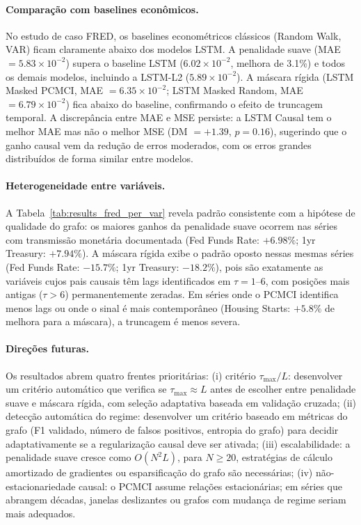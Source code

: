 \documentclass[12pt, a4paper]{article}
\begin{document}
\paragraph{Comparação com baselines econômicos.}
No estudo de caso FRED, os baselines econométricos clássicos (Random Walk, VAR) ficam claramente abaixo dos modelos LSTM. A penalidade suave (MAE $= 5.83 \times 10^{-2}$) supera o baseline LSTM ($6.02 \times 10^{-2}$, melhora de 3.1\%) e todos os demais modelos, incluindo a LSTM-L2 ($5.89 \times 10^{-2}$). A máscara rígida (LSTM Masked PCMCI, MAE $= 6.35 \times 10^{-2}$; LSTM Masked Random, MAE $= 6.79 \times 10^{-2}$) fica abaixo do baseline, confirmando o efeito de truncagem temporal. A discrepância entre MAE e MSE persiste: a LSTM Causal tem o melhor MAE mas não o melhor MSE (DM $= +1.39$, $p = 0.16$), sugerindo que o ganho causal vem da redução de erros moderados, com os erros grandes distribuídos de forma similar entre modelos.

\paragraph{Heterogeneidade entre variáveis.}
A Tabela~\ref{tab:results_fred_per_var} revela padrão consistente com a hipótese de qualidade do grafo: os maiores ganhos da penalidade suave ocorrem nas séries com transmissão monetária documentada (Fed Funds Rate: $+6.98\%$; 1yr Treasury: $+7.94\%$). A máscara rígida exibe o padrão oposto nessas mesmas séries (Fed Funds Rate: $-15.7\%$; 1yr Treasury: $-18.2\%$), pois são exatamente as variáveis cujos pais causais têm lags identificados em $\tau = 1$--$6$, com posições mais antigas ($\tau > 6$) permanentemente zeradas. Em séries onde o PCMCI identifica menos lags ou onde o sinal é mais contemporâneo (Housing Starts: $+5.8\%$ de melhora para a máscara), a truncagem é menos severa.

\paragraph{Direções futuras.}
Os resultados abrem quatro frentes prioritárias: (i) critério $\tau_{\max}/L$: desenvolver um critério automático que verifica se $\tau_{\max} \approx L$ antes de escolher entre penalidade suave e máscara rígida, com seleção adaptativa baseada em validação cruzada; (ii) detecção automática do regime: desenvolver um critério baseado em métricas do grafo (F1 validado, número de falsos positivos, entropia do grafo) para decidir adaptativamente se a regularização causal deve ser ativada; (iii) escalabilidade: a penalidade suave cresce como $O(N^2 L)$, para $N \geq 20$, estratégias de cálculo amortizado de gradientes ou esparsificação do grafo são necessárias; (iv) não-estacionariedade causal: o PCMCI assume relações estacionárias; em séries que abrangem décadas, janelas deslizantes ou grafos com mudança de regime seriam mais adequados.
\end{document}
